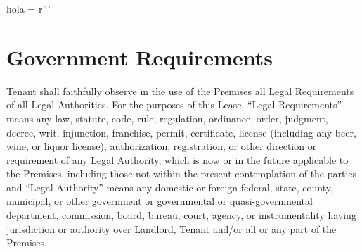 hola = r'''\documentclass{article}
\begin{document}
\section{Government Requirements}
    Tenant shall faithfully observe in the use of the Premises all Legal Requirements of all Legal Authorities. For the purposes of this Lease, ``Legal Requirements'' means any law, statute, code, rule, regulation, ordinance, order, judgment, decree, writ, injunction, franchise, permit, certificate, license (including any beer, wine, or liquor license), authorization, registration, or other direction or requirement of any Legal Authority, which is now or in the future applicable to the Premises, including those not within the present contemplation of the parties and ``Legal Authority'' means any domestic or foreign federal, state, county, municipal, or other government or governmental or quasi-governmental department, commission, board, bureau, court, agency, or instrumentality having jurisdiction or authority over Landlord, Tenant and/or all or any part of the Premises.
    
\end{document}
